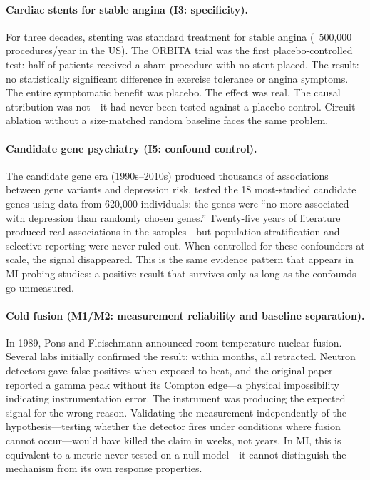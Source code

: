 \documentclass{article}
\begin{document}
\paragraph{Cardiac stents for stable angina (I3: specificity).}
For three decades, stenting was standard treatment for stable angina (~500,000 procedures/year in the US). The ORBITA trial \citep{alhabib2018orbita} was the first placebo-controlled test: half of patients received a sham procedure with no stent placed. The result: no statistically significant difference in exercise tolerance or angina symptoms. The entire symptomatic benefit was placebo. The effect was real. The causal attribution was not---it had never been tested against a placebo control. Circuit ablation without a size-matched random baseline faces the same problem.

\paragraph{Candidate gene psychiatry (I5: confound control).}
The candidate gene era (1990s--2010s) produced thousands of associations between gene variants and depression risk. \citet{border2019no} tested the 18 most-studied candidate genes using data from 620,000 individuals: the genes were ``no more associated with depression than randomly chosen genes.'' Twenty-five years of literature produced real associations in the samples---but population stratification and selective reporting were never ruled out. When \citet{border2019no} controlled for these confounders at scale, the signal disappeared. This is the same evidence pattern that appears in MI probing studies: a positive result that survives only as long as the confounds go unmeasured.

\paragraph{Cold fusion (M1/M2: measurement reliability and baseline separation).}
In 1989, Pons and Fleischmann announced room-temperature nuclear fusion. Several labs initially confirmed the result; within months, all retracted. Neutron detectors gave false positives when exposed to heat, and the original paper reported a gamma peak without its Compton edge---a physical impossibility indicating instrumentation error. The instrument was producing the expected signal for the wrong reason. Validating the measurement independently of the hypothesis---testing whether the detector fires under conditions where fusion cannot occur---would have killed the claim in weeks, not years. In MI, this is equivalent to a metric never tested on a null model---it cannot distinguish the mechanism from its own response properties.
\end{document}
